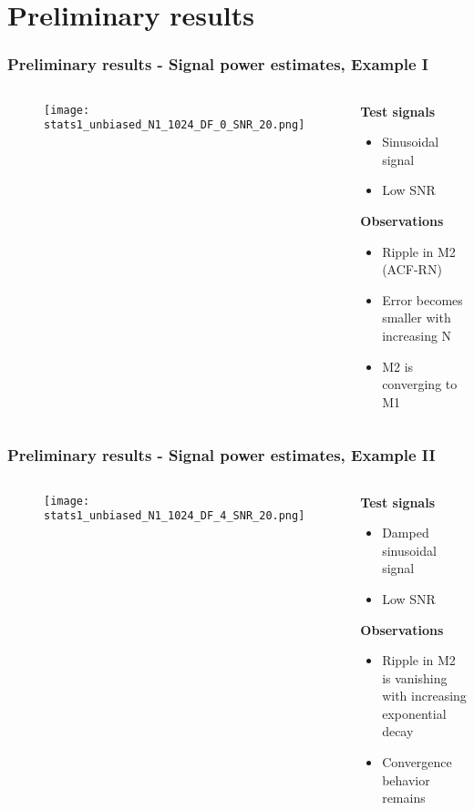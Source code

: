 \documentclass[11pt,aspectratio=169]{beamer}
\begin{document}
	\section{Preliminary results}
	\begin{frame}
		\frametitle{Preliminary results - Signal power estimates, Example I}
		\begin{columns}[t]
			\begin{RIPcolleft}
				\begin{figure}
					\texttt{[image: stats1\_unbiased\_N1\_1024\_DF\_0\_SNR\_20.png]}
				\end{figure}
			\end{RIPcolleft}
			\begin{RIPcolright}
				\textbf{Test signals}\\
				\begin{itemize}
					\item Sinusoidal signal
					\item Low SNR
				\end{itemize}
				\textbf{Observations}\\
				\begin{itemize}
					\item Ripple in M2 (ACF-RN)
					\item Error becomes smaller with increasing N
					\item M2 is converging to M1
				\end{itemize}
			\end{RIPcolright}
		\end{columns}
	\end{frame}
	\begin{frame}
		\frametitle{Preliminary results - Signal power estimates, Example II}
		\begin{columns}[t]
			\begin{RIPcolleft}
				\begin{figure}
					\texttt{[image: stats1\_unbiased\_N1\_1024\_DF\_4\_SNR\_20.png]}
				\end{figure}
			\end{RIPcolleft}
			\begin{RIPcolright}
				\textbf{Test signals}\\
				\begin{itemize}
					\item Damped sinusoidal signal
					\item Low SNR
				\end{itemize}
				\textbf{Observations}\\
				\begin{itemize}
					\item Ripple in M2 is vanishing with increasing exponential decay
					\item Convergence behavior remains
				\end{itemize}
			\end{RIPcolright}
		\end{columns}
	\end{frame}
\end{document}
